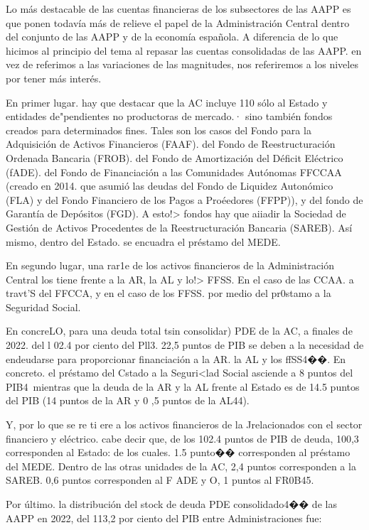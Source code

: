 \documentclass[10pt,a4paper]{article}
\begin{document}
Lo más destacable de las cuentas financieras de los subsectores de las AAPP es que ponen todavía más de relieve el papel de la Administración Central dentro del conjunto de las AAPP y de la economía española. A diferencia de lo que hicimos al principio del tema al repasar las cuentas consolidadas de las AAPP. en vez de referimos a las variaciones de las magnitudes, nos referiremos a los niveles por tener más interés.

En primer lugar. hay que destacar que la AC incluye 110 sólo al Estado y entidades de"pendientes no productoras de mercado.· sino también fondos creados para determinados fines. Tales son los casos del Fondo para la Adquisición de Activos Financieros (FAAF). del Fondo de Reestructuración Ordenada Bancaria (FROB). del Fondo de Amortización del Déficit Eléctrico (fADE). del Fondo de Financiación a las Comunidades Autónomas FFCCAA (creado en 2014. que asumió las deudas del Fondo de Liquidez Autonómico (FLA) y del Fondo Financiero de los Pagos a Pro\'eedores (FFPP)), y del fondo de Garantía de Depósitos (FGD). A esto!> fondos hay que aiiadir la Sociedad de Gestión de Activos Procedentes de la Reestructuración Bancaria (SAREB). Así mismo, dentro del Estado. se encuadra el préstamo del MEDE.

En segundo lugar, una rar1e de los activos financieros de la Administración Central los tiene frente a la AR, la AL y lo!> FFSS. En el caso de las CCAA. a travt'S del FFCCA, y en el caso de los FFSS. por medio del pr0stamo a la Seguridad Social.

En concreLO, para una deuda total tsin consolidar) PDE de la AC, a finales de 2022. del l 02.4 por ciento del Pll3. 22,5 puntos de PIB se deben a la necesidad de endeudarse para proporcionar financiación a la AR. la AL y los ffSS4��. En concreto. el préstamo del Cstado a la Seguri<lad Social asciende a 8 puntos del PIB4\ mientras que la deuda de la AR y la AL frente al Estado es de 14.5 puntos del PIB (14 puntos de la AR y 0 ,5 puntos de la AL44).

Y, por lo que se re ti ere a los activos financieros de la J\C relacionados con el sector financiero y eléctrico. cabe decir que, de los 102.4 puntos de PIB de deuda, 100,3 corresponden al Estado: de los cuales. 1.5 punto�� corresponden al préstamo del MEDE. Dentro de las otras unidades de la AC, 2,4 puntos corresponden a la SAREB. 0,6 puntos corresponden al F ADE y O, 1 puntos al FR0B45.

Por último. la distribución del stock de deuda PDE consolidado4�� de las AAPP en 2022, del 113,2 por ciento del PIB entre Administraciones fue:
\end{document}
